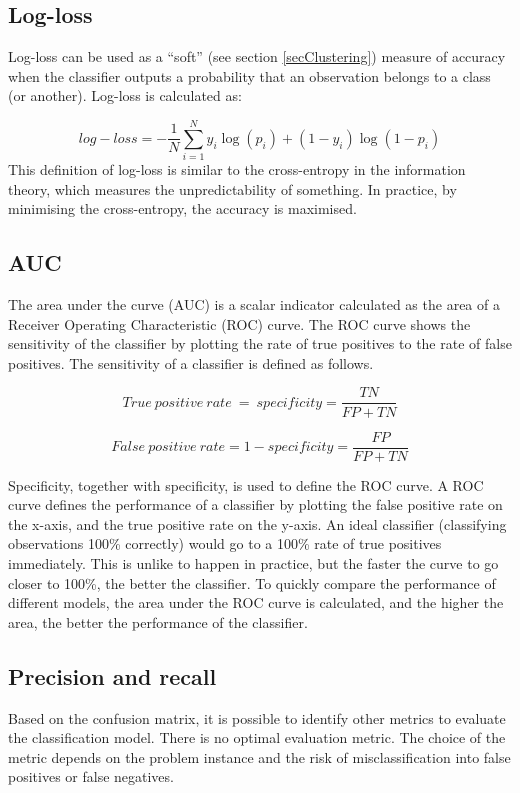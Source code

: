\subsection{Log-loss}
Log-loss can be used as a “soft” (see section \ref{secClustering}) measure of accuracy when the classifier outputs a probability that an observation belongs to a class (or another). Log-loss is calculated as:

\begin{equation}
    log-loss=-\frac{1}{N}\sum_{i=1}^{N}{y_i\log{(p_i)}+(1-y_i)\log(1-p_i)}
    \label{eq_logloss}
\end{equation}
This definition of log-loss is similar to the cross-entropy in the information theory, which measures the unpredictability of something. In practice, by minimising the cross-entropy, the accuracy is maximised.

\subsection{AUC}
The area under the curve (AUC) is a scalar indicator calculated as the area of a Receiver Operating Characteristic (ROC) curve. The ROC curve shows the sensitivity of the classifier by plotting the rate of true positives to the rate of false positives. The sensitivity of a classifier is defined as follows.

\begin{equation}
    True\ positive\ rate\ =\ specificity=\frac{TN}{FP+TN}
    \label{eq_specificity}
\end{equation}

\begin{equation}
    False\ positive\ rate=1-specificity=\frac{FP}{FP+TN}
    \label{eq_falsePositiveRate}
\end{equation}

Specificity, together with specificity, is used to define the ROC curve. A ROC curve defines the performance of a classifier by plotting the false positive rate on the x-axis, and the true positive rate on the y-axis. An ideal classifier (classifying observations 100\% correctly) would go to a 100\% rate of true positives immediately. This is unlike to happen in practice, but the faster the curve to go closer to 100\%, the better the classifier. To quickly compare the performance of different models, the area under the ROC curve is calculated, and the higher the area, the better the performance of the classifier.

\subsection{Precision and recall}
Based on the confusion matrix, it is possible to identify other metrics to evaluate the classification model. There is no optimal evaluation metric. The choice of the metric depends on the problem instance and the risk of misclassification into false positives or false negatives.

